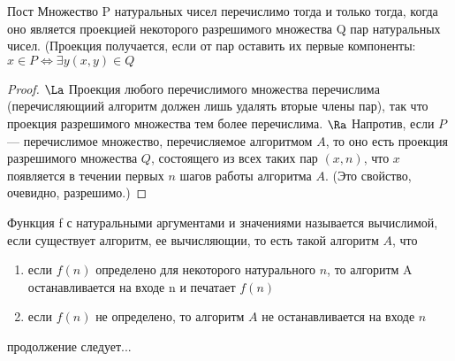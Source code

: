 \begin{theorem}{Пост}
	Множество P натуральных чисел перечислимо тогда и только тогда, когда оно является проекцией некоторого разрешимого множества Q пар натуральных чисел. (Проекция получается, если от пар оставить их первые компоненты: $x \in P \Leftrightarrow \exists y (x, y) \in Q$
\end{theorem}
\begin{proof}
	$\La$
	Проекция любого перечислимого множества перечислима (перечисляющиий алгоритм должен лишь удалять вторые члены пар), так что проекция разрешимого множества тем более перечислима.
	$\Ra$
Напротив, если $P$ — перечислимое множество, перечисляемое алгоритмом $A$, то оно есть проекция разрешимого множества $Q$, состоящего из всех таких пар $(x, n)$, что $x$ появляется в течении первых $n$ шагов работы алгоритма $A$. (Это свойство, очевидно, разрешимо.) 
\end{proof}
\begin{Def}
Функция f с натуральными аргументами и значениями называется вычислимой, если существует алгоритм, ее вычисляющии, то есть такой алгоритм $A$, что
\begin{enumerate}
\item если $f(n)$ определено для некоторого натурального $n$, то алгоритм A останавливается на входе n и печатает $f(n)$
\item если $f(n)$ не определено, то алгоритм $A$ не останавливается на входе $n$
\end{enumerate}
\end{Def}
продолжение следует...